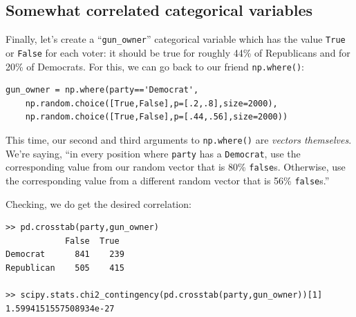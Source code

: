 \subsection{Somewhat correlated categorical variables}

Finally, let's create a ``\texttt{gun\_owner}'' categorical variable which has
the value \texttt{True} or \texttt{False} for each voter: it should be true
for roughly 44\% of Republicans and for 20\% of Democrats. For this, we can go
back to our friend \texttt{np.where()}:

\begin{Verbatim}[fontsize=\footnotesize,samepage=true]
gun_owner = np.where(party=='Democrat',
    np.random.choice([True,False],p=[.2,.8],size=2000),
    np.random.choice([True,False],p=[.44,.56],size=2000))
\end{Verbatim}

This time, our second and third arguments to \texttt{np.where()} are
\textit{vectors themselves}. We're saying, ``in every position where
\texttt{party} has a \texttt{\textquotesingle Democrat\textquotesingle }, use
the corresponding value from our random vector that is 80\% \texttt{false}s.
Otherwise, use the corresponding value from a different random vector that is
56\% \texttt{false}s.''

Checking, we do get the desired correlation:

\begin{Verbatim}[fontsize=\footnotesize,samepage=true]
>> pd.crosstab(party,gun_owner)
            False  True 
Democrat      841    239
Republican    505    415

>> scipy.stats.chi2_contingency(pd.crosstab(party,gun_owner))[1]
1.5994151557508934e-27
\end{Verbatim}

